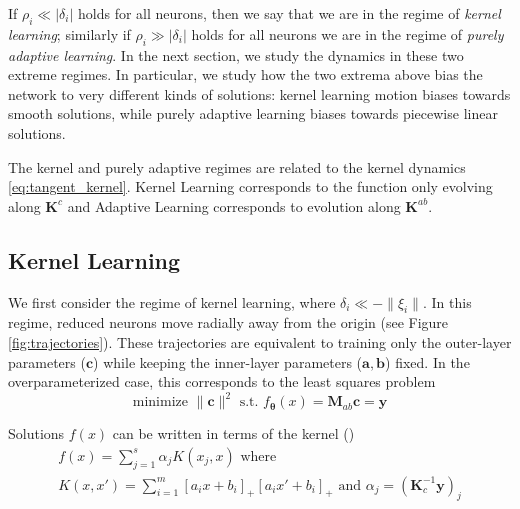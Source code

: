 \begin{remark}
\end{remark}

If $\rho_i \ll |\delta_i|$ holds for all neurons, then we say that we are in the regime of \emph{kernel learning}; similarly if $\rho_i \gg |\delta_i|$ holds for all neurons we are in the regime of \emph{purely adaptive learning}. In the next section, we study the dynamics in these two extreme regimes.
In particular, we study how the two extrema above bias the network to very different kinds of solutions: kernel learning motion biases towards smooth solutions, while purely adaptive learning biases towards piecewise linear solutions. 

\begin{remark}
The kernel and purely adaptive regimes are related to the kernel dynamics \eqref{eq:tangent_kernel}. Kernel Learning corresponds to the function only evolving along $\bm K^c$ and Adaptive Learning corresponds to evolution along $\bm K^{ab}$.  
\end{remark}










\subsection{Kernel Learning}
We first consider the regime of kernel learning, where $\delta_i \ll -\|\xi_i\|$. In this regime, reduced neurons move radially away from the origin (see Figure \ref{fig:trajectories}). These trajectories are equivalent to training only the outer-layer parameters ($\bm c$) while keeping the inner-layer parameters ($\bm a, \bm b$) fixed. In the overparameterized case, this corresponds to the least squares problem
\begin{equation}\label{eq:least_squares_op}
    \text{minimize } \|\bm c\|^2 \text{ s.t. } f_{\bm \theta}(x) = \bm M_{ab} \bm c = \bm y
\end{equation}

Solutions $f(x)$ can be written in terms of the kernel ()
\begin{equation}
\begin{gathered}
    f(x) = \sum_{j=1}^s \alpha_j K(x_j, x) \text{ where } \\
    K(x, x') = \sum_{i=1}^m [a_i x + b_i]_+ [a_i x' + b_i]_+ \text{ and } \alpha_j = (\bm K_c^{-1} \bm y)_j  
\end{gathered}
\end{equation}

